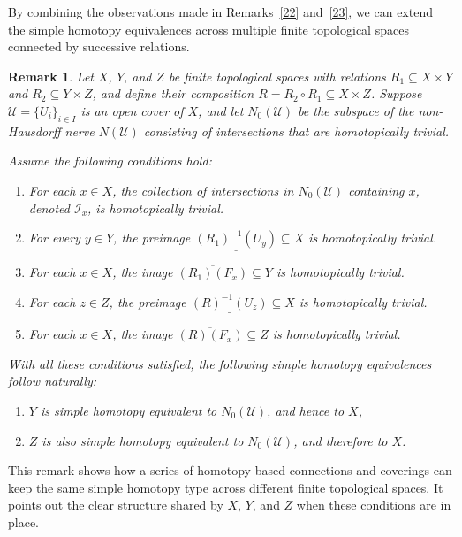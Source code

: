 \documentclass[12pt,a4paper,twoside, reqno, tbtags]{article}
\numberwithin{equation}{section}
\newtheorem{remark}{Remark}[section]
\begin{document}
    \noindent By combining the observations made in Remarks~\ref{22} and~\ref{23}, we can extend the simple homotopy equivalences across multiple finite topological spaces connected by successive relations.
    \begin{remark}\label{24}
    	Let \( X \), \( Y \), and \( Z \) be finite topological spaces with relations \( R_1 \subseteq X \times Y \) and \( R_2 \subseteq Y \times Z \), and define their composition \( R = R_2 \circ R_1 \subseteq X \times Z \). Suppose \( \mathcal{U} = \{U_i\}_{i \in I} \) is an open cover of \( X \), and let \( N_0(\mathcal{U}) \) be the subspace of the non-Hausdorff nerve \( N(\mathcal{U}) \) consisting of intersections that are homotopically trivial.
    	
    	Assume the following conditions hold:
    	\begin{enumerate}
    		\item For each \( x \in X \), the collection of intersections in \( N_0(\mathcal{U}) \) containing \( x \), denoted \( \mathcal{I}_x \), is homotopically trivial.
    		\item For every \( y \in Y \), the preimage \( \underline{(R_1)^{-1}(U_y)} \subseteq X \) is homotopically trivial.
    		\item For each \( x \in X \), the image \( \overline{(R_1)(F_x)} \subseteq Y \) is homotopically trivial.
    		\item For each \( z \in Z \), the preimage \( \underline{(R)^{-1}(U_z)} \subseteq X \) is homotopically trivial.
    		\item For each \( x \in X \), the image \( \overline{(R)(F_x)} \subseteq Z \) is homotopically trivial.
    	\end{enumerate}
    	
    	With all these conditions satisfied, the following simple homotopy equivalences follow naturally:
    	\begin{enumerate}[label=\alph*.]
    		\item \( Y \) is simple homotopy equivalent to \( N_0(\mathcal{U}) \), and hence to \( X \),
    		\item \( Z \) is also simple homotopy equivalent to \( N_0(\mathcal{U}) \), and therefore to \( X \).
    	\end{enumerate}
    \end{remark}
    \noindent This remark shows how a series of homotopy-based connections and coverings can keep the same simple homotopy type across different finite topological spaces. It points out the clear structure shared by \( X \), \( Y \), and \( Z \) when these conditions are in place.
        
\end{document}
